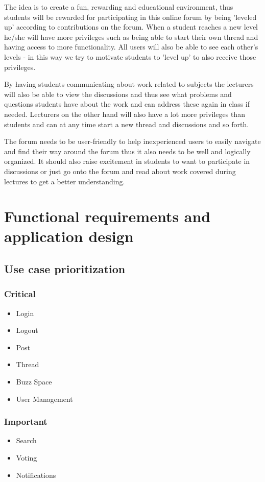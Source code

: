 \documentclass[12pt, oneside]{article}
\begin{document}
The idea is to create a fun, rewarding and educational environment, thus students will be rewarded for participating in this online forum by being 'leveled up' according to contributions on the forum. When a student reaches a new level he/she will have more privileges such as being able to start their own thread and having access to more functionality. All users will also be able to see each other's levels - in this way we try to motivate students to 'level up' to also receive those privileges.   

By having students communicating about work related to subjects the lecturers will also be able to view the discussions and thus see what problems and questions students have about the work and can address these again in class if needed. Lecturers on the other hand will also have a lot more privileges than students and can at any time start a new thread and discussions and so forth. 

The forum needs to be user-friendly to help inexperienced users to easily navigate and find their way around the forum thus it also needs to be well and logically organized. It should also raise excitement in students to want to participate in discussions or just go onto the forum and read about work covered during lectures to get a better understanding. 

	
\section{Functional requirements and application design}
	\subsection{Use case prioritization}
		\subsubsection{Critical}
			\begin{itemize}
				\item Login
				\item Logout
				\item Post
				\item Thread
				\item Buzz Space
				\item User Management
			 \end{itemize}
		\subsubsection{Important}
			\begin{itemize}
				\item Search
				\item Voting
				\item Notifications
			 \end{itemize}
\end{document}
